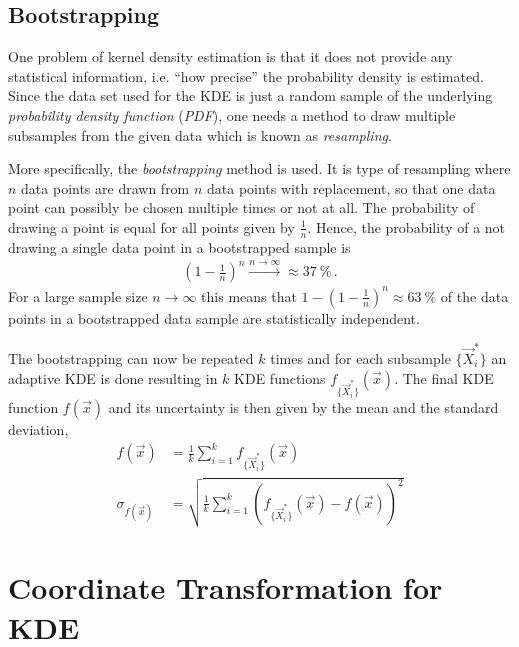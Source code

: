 \subsection{Bootstrapping}\label{sec:bootstrapping}

One problem of kernel density estimation is that it does not provide any statistical information, i.e. \enquote{how precise} the probability density is estimated. Since the data set used for the KDE is just a random sample of the underlying \textit{probability density function} (\textit{PDF}), one needs a method to draw multiple subsamples from the given data which is known as \textit{resampling}.

More specifically, the \textit{bootstrapping} method is used. It is type of resampling where $n$ data points are drawn from $n$ data points with replacement, so that one data point can possibly be chosen multiple times or not at all. The probability of drawing a point is equal for all points given by $\frac{1}{n}$. Hence, the probability of a not drawing a single data point in a bootstrapped sample is
\begin{align}
	\left(1-\frac{1}{n}\right)^n \overset{n\to\infty}{\longrightarrow} \approx\SI{37}{\percent}\,.
\end{align}
For a large sample size $n\to\infty$ this means that $1-\left(1-\frac{1}{n}\right)^n\approx\SI{63}{\percent}$ of the data points in a bootstrapped data sample are statistically independent.

The bootstrapping can now be repeated $k$ times and for each subsample $\{\vec{X}_i^\ast\}$ an adaptive KDE is done resulting in $k$ KDE functions $f_{\{\vec{X}_i^\ast\}}(\vec{x})$. The final KDE function $f(\vec{x})$ and its uncertainty is then given by the mean and the standard deviation,~\cite{kde:bootstrapping,kde:schoenen}
\begin{subequations}
	\begin{align}
		f(\vec{x}) &= \frac{1}{k}\sum_{i=1}^{k} f_{\{\vec{X}_i^\ast\}}(\vec{x})\\
		\sigma_{f(\vec{x})}	&= \sqrt{\frac{1}{k}\sum_{i=1}^{k}\left(f_{\{\vec{X}_i^\ast\}}(\vec{x}) - f(\vec{x})\right)^2}
	\end{align}
\end{subequations}

\section{Coordinate Transformation for KDE}

